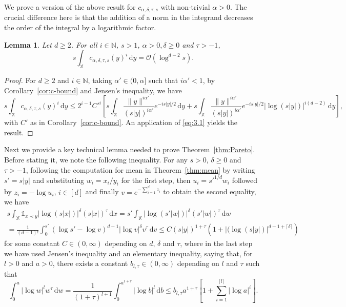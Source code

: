 \documentclass[11pt,reqno]{amsart}
\numberwithin{equation}{section}
\newtheorem{lemma}[theorem]{Lemma}
\theoremstyle{definition}
\newcommand{\N}{\mathbb{N}}
\newcommand{\XX}{\mathbb{X}}
\newcommand{\diff}{{\,\mathrm d}}
\begin{document}
We prove a version of the above result for $c_{\alpha,\delta,\tau,s}$ with non-trivial $\alpha>0$. The crucial difference here is that the addition of a norm in the integrand decreases the order of the integral by a logarithmic factor.
\begin{lemma}\label{lem:intbd'}
	Let $d \ge 2$. For all $i \in \N$, $s>1$, $\alpha>0, \delta \ge 0$ and $\tau>-1$,
	\begin{equation*}
	s\int_{\XX}  c_{\alpha,\delta,\tau,s}(y)^i \diff y=
	\mathcal{O}(\log^{d-2} s).
	\end{equation*}
\end{lemma}
\begin{proof}
	For $d \ge 2$ and $i \in \N$, taking $\alpha' \in (0,\alpha]$ such that $i\alpha'<1$, by Corollary~\ref{cor:c-bound} and Jensen's inequality, we have
	\begin{equation*}
	s\int_{\XX} c_{\alpha,\delta,\tau,s}(y)^i \diff y
	\le 2^{i-1} C'^i \left[s \int_{\XX}  \frac{\|y\|^{i\alpha'}}{(s|y|)^{i\alpha'}}  e^{- is|y|/2} \diff y
	+  s \int_{\XX}  \frac{\|y\|^{i\alpha'}}{(s|y|)^{i\alpha'}} e^{- is|y|/2} \big|\log(s|y|)\big|^{i(d-2)}
	\diff y\right],
	\end{equation*}
	with $C'$ as in Corollary~\ref{cor:c-bound}. An application of \eqref{eq:3.1} yields the result.
\end{proof} 


Next we provide a key technical lemma needed to prove Theorem~\ref{thm:Pareto}. Before stating it, we note the following inequality. For any $s>0$, $\delta \ge 0$ and $\tau>-1$, following the computation for mean in Theorem~\ref{thm:mean} by writing $s'=s|y|$ and substituting $w_i=x_i/y_i$ for the first step, then $u_i=s'^{1/d} w_i$ followed by $z_i=-\log u_i$, $i\in [d]$ and finally $v=e^{-\sum_{i=1}^d z_i}$ to obtain the second equality, we have
\begin{multline}\label{eq:logint}
s \int_\XX \mathds{1}_{x \prec y} \big|\log (s|x|)\big|^\delta (s|x|)^\tau \diff x
=s' \int_{\XX} \big|\log (s'|w|)\big|^\delta (s'|w|)^\tau \diff w  \\
=\frac{1}{(d-1)!} \int_0^{s'} \left(\log s' - \log v \right)^{d-1} | \log v|^\delta v^\tau\diff v \le C (s|y|)^{1+\tau} \left(1+\big|(\log (s|y|)\big|^{d-1+\lceil\delta\rceil}\right)
\end{multline}
for some constant $C \in (0,\infty)$ depending on $d$, $\delta$ and $\tau$, where in the last step we have used Jensen's inequality and an elementary
inequality, saying that, for $l >0$ and
$a>0$, there exists a constant $b_{l,\tau} \in (0,\infty)$ depending on $l$ and $\tau$ such
that
\begin{displaymath}
\int_0^{a} |\log w|^l w^\tau\diff w = \frac{1}{(1+\tau)^{l+1}} \int_0^{a^{1+\tau}} |\log b|^l \diff b \le b_{l,\tau} a^{1+\tau}
\left[1+\sum_{i=1}^{\lceil l \rceil} |\log a|^i\right].
\end{displaymath}
\end{document}
